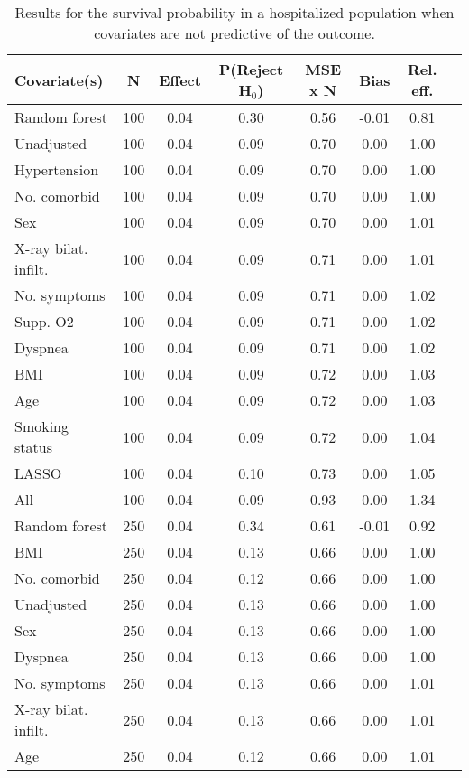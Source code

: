 \documentclass{article}
\begin{document}
\clearpage

{\tabcolsep=6pt  %
\begin{longtable}{lccccccc}
\caption{Results for the survival probability in a hospitalized population when covariates are not predictive of the outcome.} \\
Covariate(s) & N & Effect & P(Reject H$_0$) & MSE x N & Bias & Rel. eff.\\ \midrule
Random forest & 100 & 0.04 & 0.30 & 0.56 & -0.01 & 0.81 \\ 
Unadjusted & 100 & 0.04 & 0.09 & 0.70 &  0.00 & 1.00 \\ 
Hypertension & 100 & 0.04 & 0.09 & 0.70 &  0.00 & 1.00 \\ 
No. comorbid & 100 & 0.04 & 0.09 & 0.70 &  0.00 & 1.00 \\ 
Sex & 100 & 0.04 & 0.09 & 0.70 &  0.00 & 1.01 \\ 
X-ray bilat. infilt. & 100 & 0.04 & 0.09 & 0.71 &  0.00 & 1.01 \\ 
No. symptoms & 100 & 0.04 & 0.09 & 0.71 &  0.00 & 1.02 \\ 
Supp. O2 & 100 & 0.04 & 0.09 & 0.71 &  0.00 & 1.02 \\ 
Dyspnea & 100 & 0.04 & 0.09 & 0.71 &  0.00 & 1.02 \\ 
BMI & 100 & 0.04 & 0.09 & 0.72 &  0.00 & 1.03 \\ 
Age & 100 & 0.04 & 0.09 & 0.72 &  0.00 & 1.03 \\ 
Smoking status & 100 & 0.04 & 0.09 & 0.72 &  0.00 & 1.04 \\ 
LASSO & 100 & 0.04 & 0.10 & 0.73 &  0.00 & 1.05 \\ 
All & 100 & 0.04 & 0.09 & 0.93 &  0.00 & 1.34 \\ \midrule() 
Random forest & 250 & 0.04 & 0.34 & 0.61 & -0.01 & 0.92 \\ 
BMI & 250 & 0.04 & 0.13 & 0.66 &  0.00 & 1.00 \\ 
No. comorbid & 250 & 0.04 & 0.12 & 0.66 &  0.00 & 1.00 \\ 
Unadjusted & 250 & 0.04 & 0.13 & 0.66 &  0.00 & 1.00 \\ 
Sex & 250 & 0.04 & 0.13 & 0.66 &  0.00 & 1.00 \\ 
Dyspnea & 250 & 0.04 & 0.13 & 0.66 &  0.00 & 1.00 \\ 
No. symptoms & 250 & 0.04 & 0.13 & 0.66 &  0.00 & 1.01 \\ 
X-ray bilat. infilt. & 250 & 0.04 & 0.13 & 0.66 &  0.00 & 1.01 \\ 
Age & 250 & 0.04 & 0.12 & 0.66 &  0.00 & 1.01 \\ 

\end{longtable}}
\end{document}
